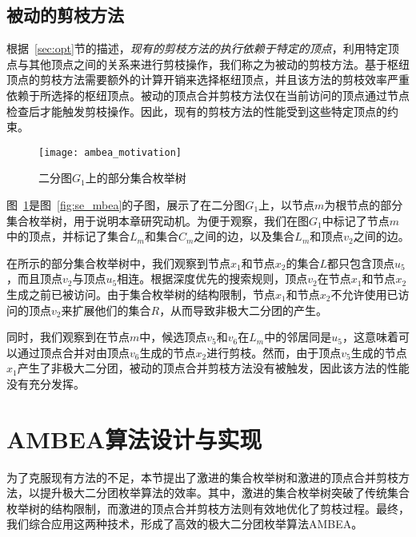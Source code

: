 \subsection{被动的剪枝方法}

根据~\ref{sec:opt}节的描述，\emph{现有的剪枝方法的执行依赖于特定的顶点}，利用特定顶点与其他顶点之间的关系来进行剪枝操作，我们称之为被动的剪枝方法。基于枢纽顶点的剪枝方法需要额外的计算开销来选择枢纽顶点，并且该方法的剪枝效率严重依赖于所选择的枢纽顶点。被动的顶点合并剪枝方法仅在当前访问的顶点通过节点检查后才能触发剪枝操作。因此，现有的剪枝方法的性能受到这些特定顶点的约束。

\begin{figure} [h]
  \centering
  \vspace{0.1 in}
  \texttt{[image: ambea\_motivation]}
  \vspace{0.1 in}
  \caption{二分图$G_1$上的部分集合枚举树}
  \label{fig:ambea_motivation}
\end{figure}

\begin{example}
  图~\ref{fig:ambea_motivation}是图~\ref{fig:se_mbea}的子图，展示了在二分图$G_1$上，以节点$m$为根节点的部分集合枚举树，用于说明本章研究动机。为便于观察，我们在图$G_1$中标记了节点$m$中的顶点，并标记了集合$L_m$和集合$C_m$之间的边，以及集合$L_m$和顶点$v_2$之间的边。

  在所示的部分集合枚举树中，我们观察到节点$x_1$和节点$x_2$的集合$L$都只包含顶点$u_5$，而且顶点$v_2$与顶点$u_5$相连。根据深度优先的搜索规则，顶点$v_2$在节点$x_1$和节点$x_2$生成之前已被访问。由于集合枚举树的结构限制，节点$x_1$和节点$x_2$不允许使用已访问的顶点$v_2$来扩展他们的集合$R$，从而导致非极大二分团的产生。

  同时，我们观察到在节点$m$中，候选顶点$v_5$和$v_6$在$L_m$中的邻居同是$u_5$，这意味着可以通过顶点合并对由顶点$v_6$生成的节点$x_2$进行剪枝。然而，由于顶点$v_5$生成的节点$x_1$产生了非极大二分团，被动的顶点合并剪枝方法没有被触发，因此该方法的性能没有充分发挥。

\end{example}

\section{AMBEA算法设计与实现}

为了克服现有方法的不足，本节提出了激进的集合枚举树和激进的顶点合并剪枝方法，以提升极大二分团枚举算法的效率。其中，激进的集合枚举树突破了传统集合枚举树的结构限制，而激进的顶点合并剪枝方法则有效地优化了剪枝过程。最终，我们综合应用这两种技术，形成了高效的极大二分团枚举算法AMBEA。

